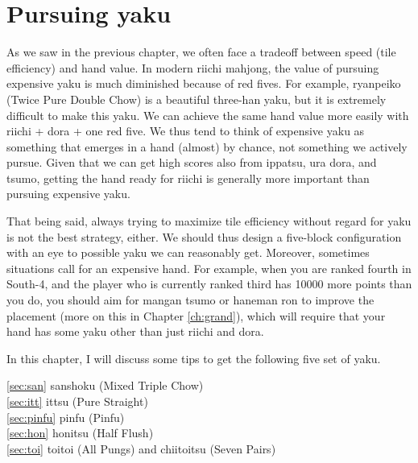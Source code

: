 
\chapter{Pursuing yaku} \label{ch:yaku}
\thispagestyle{empty}

\bigskip
As we saw in the previous chapter, we often face a tradeoff between speed (tile efficiency) and hand value. In modern riichi mahjong, the value of pursuing expensive {\jap yaku} is much diminished because of red fives. 
For example, {\jap ryanpeiko} (Twice Pure Double Chow) is a beautiful three-{\jap han yaku}, but it is extremely difficult to make this {\jap yaku}. We can achieve the same hand value more easily with riichi + {\jap dora} + one red five. We thus tend to think of expensive {\jap yaku} as something that emerges in a hand (almost) by chance, not something we actively pursue. 
Given that we can get high scores also from {\jap ippatsu}, {\jap ura dora}, and {\jap tsumo}, getting the hand ready for riichi is generally more important than pursuing expensive {\jap yaku}. 

\bigskip
That being said, always trying to maximize tile efficiency without regard for {\jap yaku} is not the best strategy, either. We should thus design a five-block configuration with an eye to possible {\jap yaku} we can reasonably get. Moreover, sometimes situations call for an expensive hand. For example, when you are ranked fourth in South-4, and the player who is currently ranked third has 10000 more points than you do, you should aim for {\jap mangan tsumo} or {\jap haneman ron} to improve the placement (more on this in Chapter \ref{ch:grand}), which will require that your hand has some {\jap yaku} other than just riichi and {\jap dora}. 

\bigskip
In this chapter, I will discuss some tips to get the following five set of {\jap yaku}. 
\bigskip

\noindent\ref{sec:san} {\jap sanshoku} (Mixed Triple Chow)\\
\ref{sec:itt} {\jap ittsu} (Pure Straight)\\
\ref{sec:pinfu} {\jap pinfu} (Pinfu)\\
\ref{sec:hon} {\jap honitsu} (Half Flush)\\
\ref{sec:toi} {\jap toitoi} (All Pungs) and {\jap chiitoitsu} (Seven Pairs)

